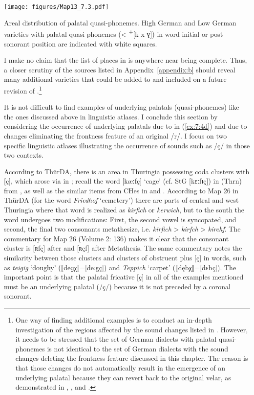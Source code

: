 \begin{map}
\texttt{[image: figures/Map13\_7.3.pdf]}
\caption[Areal distribution of palatal quasi-phonemes]{Areal distribution of palatal quasi-phonemes. High German and Low German varieties with palatal quasi-phonemes (<  \textsuperscript{+}[k x ɣ]) in word-initial or post-sonorant position are indicated with white squares.}\label{map:13}
\end{map}

I make no claim that the list of places in  is anywhere near being complete. Thus, a closer scrutiny of the sources listed in Appendix~\ref{appendix:b} should reveal many additional varieties that could be added to  and included on a future revision of .\footnote{One way of finding additional examples is to conduct an in-depth investigation of the regions affected by the sound changes listed in . However, it needs to be stressed that the set of German dialects with palatal quasi-phonemes is not identical to the set of German dialects with the sound changes deleting the frontness feature discussed in this chapter. The reason is that those changes do not automatically result in the emergence of an underlying palatal because they can revert back to the original velar, as demonstrated in , , and .}

It is not difficult to find examples of underlying palatals (quasi-phonemes) like the ones discussed above in linguistic atlases. I conclude this section by considering the occurrence of underlying palatals due to  in (\ref{ex:7:4d}) and due to changes eliminating the frontness feature of an original /r/. I focus on two specific linguistic atlases illustrating the occurrence of sounds such as /ç/ in those two contexts.

According to ThürDA, there is an area in Thuringia possessing coda clusters with [ç], which arose via  in ; recall the word [kæːfç] ‘cage’ (cf. StG [kɛːfɪç]) in  (Thrn) from , as well as the similar items from CHes in  and . According to Map 26 in ThürDA (for the word \textit{Friedhof} ‘cemetery’) there are parts of central and west Thuringia where that word is realized as \textit{kirfich} or \textit{kerwich}, but to the south the word undergoes two modifications: First, the second vowel is syncopated, and second, the final two consonants metathesize, i.e. \textit{kirfich} > \textit{kirfch} > \textit{kirchf}. The commentary for Map 26 (Volume 2: 136) makes it clear that the consonant cluster is [ʀfç] after  and [ʀçf] after Metathesis. The same commentary notes the similarity between those clusters and clusters of obstruent plus [ç] in words, such as \textit{teigig} ‘doughy’ (⟦dēɡχ⟧=[deːgç]) and \textit{Teppich} ‘carpet’ (⟦dębχ⟧=[dɛbç]). The important point is that the palatal fricative [ç] in all of the examples mentioned must be an underlying palatal (/ç/) because it is not preceded by a coronal sonorant.\largerpage[-1]

